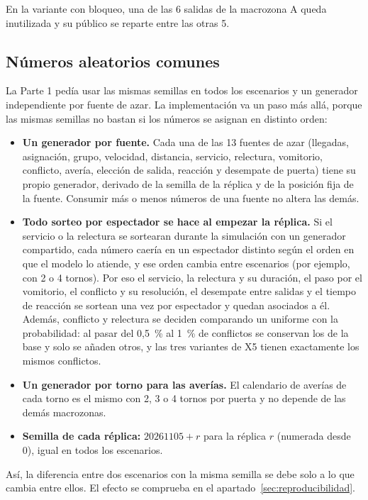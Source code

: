 En la variante con bloqueo, una de las 6 salidas de la macrozona A queda
inutilizada y su público se reparte entre las otras 5.

\subsection{Números aleatorios comunes}\label{sec:nac}

La Parte 1 pedía usar las mismas semillas en todos los escenarios y un generador
independiente por fuente de azar. La implementación va un paso más allá, porque
las mismas semillas no bastan si los números se asignan en distinto orden:

\begin{itemize}
  \item \textbf{Un generador por fuente.} Cada una de las 13 fuentes de azar
    (llegadas, asignación, grupo, velocidad, distancia, servicio, relectura,
    vomitorio, conflicto, avería, elección de salida, reacción y desempate de
    puerta) tiene su propio generador, derivado de la semilla de la réplica y de
    la posición fija de la fuente. Consumir más o menos números de una fuente no
    altera las demás.
  \item \textbf{Todo sorteo por espectador se hace al empezar la réplica.} Si el
    servicio o la relectura se sortearan durante la simulación con un generador
    compartido, cada número caería en un espectador distinto según el orden en
    que el modelo lo atiende, y ese orden cambia entre escenarios (por ejemplo,
    con 2 o 4 tornos). Por eso el servicio, la relectura y su duración, el paso
    por el vomitorio, el conflicto y su resolución, el desempate entre salidas y
    el tiempo de reacción se sortean una vez por espectador y quedan asociados a
    él. Además, conflicto y relectura se deciden comparando un uniforme con la
    probabilidad: al pasar del 0,5~\% al 1~\% de conflictos se conservan los de
    la base y solo se añaden otros, y las tres variantes de X5 tienen
    exactamente los mismos conflictos.
  \item \textbf{Un generador por torno para las averías.} El calendario de averías
    de cada torno es el mismo con 2, 3 o 4 tornos por puerta y no depende de las
    demás macrozonas.
  \item \textbf{Semilla de cada réplica:} $20261105+r$ para la réplica $r$
    (numerada desde 0), igual en todos los escenarios.
\end{itemize}

Así, la diferencia entre dos escenarios con la misma semilla se debe solo a lo
que cambia entre ellos. El efecto se comprueba en el
apartado~\ref{sec:reproducibilidad}.
